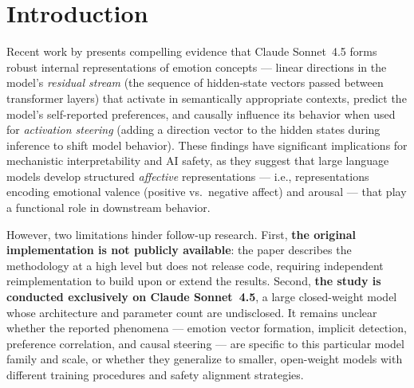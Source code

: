 \documentclass[11pt,a4paper]{article}
\begin{document}
\section{Introduction}

Recent work by \citet{anthropic2025emotion}
presents compelling evidence that Claude Sonnet~4.5 forms robust
internal representations of emotion concepts --- linear directions in
the model's \emph{residual stream} (the sequence of hidden-state
vectors passed between transformer layers) that activate in
semantically appropriate contexts, predict the model's self-reported
preferences, and causally influence its behavior when used for
\emph{activation steering} (adding a direction vector to the hidden
states during inference to shift model behavior).  These findings have
significant implications for mechanistic interpretability and AI safety,
as they suggest that large language models develop structured
\emph{affective} representations --- i.e., representations encoding
emotional valence (positive vs.\ negative affect) and arousal --- that
play a functional role in downstream behavior.

However, two limitations hinder follow-up research.  First, \textbf{the
original implementation is not publicly available}: the paper describes
the methodology at a high level but does not release code, requiring
independent reimplementation to build upon or extend the results.
Second, \textbf{the study is conducted exclusively on Claude
Sonnet~4.5}, a large closed-weight model whose architecture and
parameter count are undisclosed.  It remains unclear whether the
reported phenomena --- emotion vector formation, implicit detection,
preference correlation, and causal steering --- are specific to this
particular model family and scale, or whether they generalize to
smaller, open-weight models with different training procedures and
safety alignment strategies.
\end{document}
